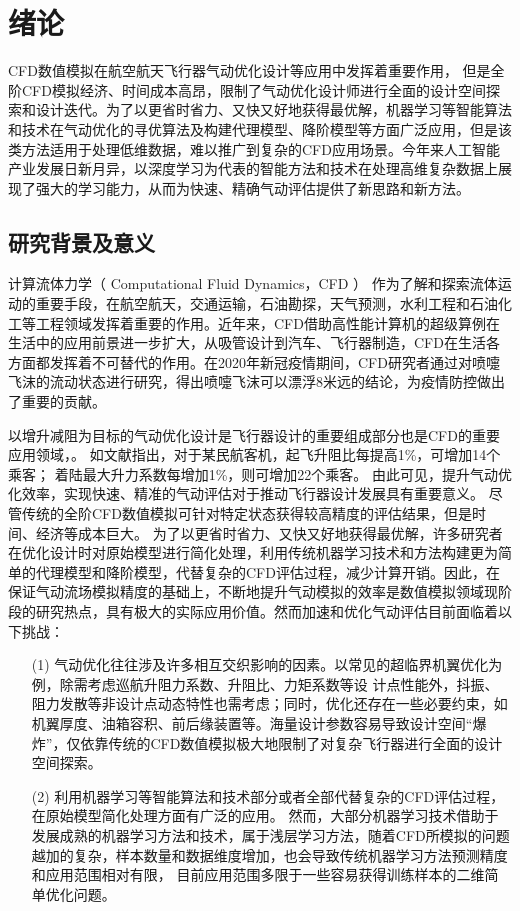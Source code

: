 \chapter{绪论}
CFD数值模拟在航空航天飞行器气动优化设计等应用中发挥着重要作用，
但是全阶CFD模拟经济、时间成本高昂，限制了气动优化设计师进行全面的设计空间探索和设计迭代。为了以更省时省力、又快又好地获得最优解，机器学习等智能算法和技术在气动优化的寻优算法及构建代理模型、降阶模型等方面广泛应用，但是该类方法适用于处理低维数据，难以推广到复杂的CFD应用场景。今年来人工智能产业发展日新月异，以深度学习为代表的智能方法和技术在处理高维复杂数据上展现了强大的学习能力，从而为快速、精确气动评估提供了新思路和新方法。



\section{研究背景及意义}
计算流体力学（ Computational Fluid Dynamics，CFD ）
作为了解和探索流体运动的重要手段，在航空航天，交通运输，石油勘探，天气预测，水利工程和石油化工等工程领域发挥着重要的作用。近年来，CFD借助高性能计算机的超级算例在生活中的应用前景进一步扩大，从吸管设计到汽车、飞行器制造，CFD在生活各方面都发挥着不可替代的作用。在2020年新冠疫情期间，CFD研究者通过对喷嚏飞沫的流动状态进行研究，得出喷嚏飞沫可以漂浮8米远的结论，为疫情防控做出了重要的贡献\cite{JAMA-喷嚏}。

以增升减阻为目标的气动优化设计是飞行器设计的重要组成部分也是CFD的重要应用领域，。
如文献\cite{增升减阻ep}指出，对于某民航客机，起飞升阻比每提高1\%，可增加14个乘客；
着陆最大升力系数每增加1\%，则可增加22个乘客。
由此可见，提升气动优化效率，实现快速、精准的气动评估对于推动飞行器设计发展具有重要意义。
尽管传统的全阶CFD数值模拟可针对特定状态获得较高精度的评估结果，但是时间、经济等成本巨大。
为了以更省时省力、又快又好地获得最优解，许多研究者在优化设计时对原始模型进行简化处理，利用传统机器学习技术和方法构建更为简单的代理模型\cite{代理模型}和降阶模型\cite{降阶模型}，代替复杂的CFD评估过程，减少计算开销。因此，在保证气动流场模拟精度的基础上，不断地提升气动模拟的效率是数值模拟领域现阶段的研究热点，具有极大的实际应用价值。然而加速和优化气动评估目前面临着以下挑战：

\vspace{-0.2cm}
\begin{itemize}
	\item[(1)] 气动优化往往涉及许多相互交织影响的因素。以常见的超临界机翼优化为例，除需考虑巡航升阻力系数、升阻比、力矩系数等设
	计点性能外，抖振、阻力发散等非设计点动态特性也需考虑；同时，优化还存在一些必要约束，如机翼厚度、油箱容积、前后缘装置等。海量设计参数容易导致设计空间“爆炸”，仅依靠传统的CFD数值模拟极大地限制了对复杂飞行器进行全面的设计空间探索。
	\item[(2)] 利用机器学习等智能算法和技术部分或者全部代替复杂的CFD评估过程，在原始模型简化处理方面有广泛的应用。
	然而，大部分机器学习技术借助于发展成熟的机器学习方法和技术，属于浅层学习方法，随着CFD所模拟的问题越加的复杂，样本数量和数据维度增加，也会导致传统机器学习方法预测精度和应用范围相对有限，
	目前应用范围多限于一些容易获得训练样本的二维简单优化问题。

\end{itemize}

